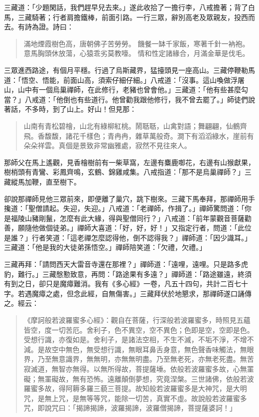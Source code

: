 三藏道：「少題閑話，我們趕早兒去來。」遂此收拾了一擔行李，八戒擔著；背了白馬，三藏騎著；行者肩擔鐵棒，前面引路。一行三眾，辭別高老及眾親友，投西而去。有詩為證。詩曰：
\begin{quote}
滿地煙霞樹色高，唐朝佛子苦勞勞。
饑餐一缽千家飯，寒著千針一衲袍。
意馬胸頭休放蕩，心猿乖劣莫教嚎。
情和性定諸緣合，月滿金華是伐毛。
\end{quote}

三眾進西路途，有個月平穩。行過了烏斯藏界，猛擡頭見一座高山。三藏停鞭勒馬道：「悟空、悟能，前面山高，須索仔細仔細。」八戒道：「沒事。這山喚做浮屠山，山中有一個烏巢禪師，在此修行，老豬也曾會他。」三藏道：「他有些甚麼勾當？」八戒道：「他倒也有些道行。他曾勸我跟他修行，我不曾去罷了。」師徒們說著話，不多時，到了山上。好山！但見那：
\begin{quote}
山南有青松碧檜，山北有綠柳紅桃。鬧聒聒，山禽對語；舞翩翩，仙鶴齊飛。香馥馥，諸花千樣色；青冉冉，雜草萬般奇。澗下有滔滔綠水，崖前有朵朵祥雲。真個是景致非常幽雅處，寂然不見往來人。
\end{quote}

那師父在馬上遙觀，見香檜樹前有一柴草窩，左邊有麋鹿啣花，右邊有山猴獻果，樹梢頭有青鸞、彩鳳齊鳴，玄鶴、錦雞咸集。八戒指道：「那不是烏巢禪師？」三藏縱馬加鞭，直至樹下。

卻說那禪師見他三眾前來，即便離了巢穴，跳下樹來。三藏下馬奉拜，那禪師用手攙道：「聖僧請起。失迎，失迎。」八戒道：「老禪師，作揖了。」禪師驚問道：「你是福陵山豬剛鬣，怎麼有此大緣，得與聖僧同行？」八戒道：「前年蒙觀音菩薩勸善，願隨他做個徒弟。」禪師大喜道：「好，好，好！」又指定行者，問道：「此位是誰？」行者笑道：「這老禪怎麼認得他，倒不認得我？」禪師道：「因少識耳。」三藏道：「他是我的大徒弟孫悟空。」禪師陪笑道：「欠禮，欠禮。」

三藏再拜：「請問西天大雷音寺還在那裡？」禪師道：「遠哩，遠哩。只是路多虎豹，難行。」三藏慇懃致意，再問：「路途果有多遠？」禪師道：「路途雖遠，終須有到之日，卻只是魔瘴難消。我有《多心經》一卷，凡五十四句，共計二百七十字。若遇魔瘴之處，但念此經，自無傷害。」三藏拜伏於地懇求，那禪師遂口誦傳之。經云：
\begin{quote}
《摩訶般若波羅蜜多心經》：觀自在菩薩，行深般若波羅蜜多，時照見五蘊皆空，度一切苦厄。舍利子，色不異空，空不異色；色即是空，空即是色。受想行識，亦復如是。舍利子，是諸法空相，不生不滅，不垢不淨，不增不減。是故空中無色，無受想行識，無眼耳鼻舌身意，無色聲香味觸法，無眼界，乃至無意識界，無無明，亦無無明盡。乃至無老死，亦無老死盡。無苦寂滅道，無智亦無得。以無所得故，菩提薩埵。依般若波羅蜜多故，心無罣礙；無罣礙故，無有恐怖。遠離顛倒夢想，究竟涅槃。三世諸佛，依般若波羅蜜多故，得阿耨多羅三藐三菩提。故知般若波羅蜜多是大神咒，是大明咒，是無上咒，是無等等咒，能除一切苦，真實不虛。故說般若波羅蜜多咒，即說咒曰：「揭諦揭諦，波羅揭諦，波羅僧揭諦，菩提薩婆訶！」
\end{quote}

